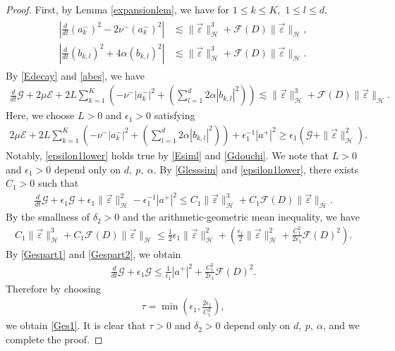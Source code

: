 \documentclass[reqno]{amsart}
\theoremstyle{plain}
\theoremstyle{definition}
\numberwithin{equation}{section}
\newcommand{\1}{\mathbbm{1}}
\begin{document}
\begin{proof}
First, by Lemma \ref{expansionlem}, we have for $1\leq k\leq K$,\ $1\leq l\leq d$, 
\begin{align}\label{abes}
\begin{aligned}
\left| \frac{d}{dt}(a_k^-)^2-2\nu^-(a_k^-)^2 \right|&\lesssim \|\vec{\varepsilon}\|_{\mathcal{H}}^3+\mathcal{F}(D)\|\vec{\varepsilon}\|_{\mathcal{H}},
\\
\left| \frac{d}{dt}(b_{k,l})^2+4\alpha (b_{k,l})^2\right|&\lesssim \|\vec{\varepsilon}\|_{\mathcal{H}}^3+\mathcal{F}(D)\|\vec{\varepsilon}\|_{\mathcal{H}}.
\end{aligned}
\end{align}
By \eqref{Edecay} and \eqref{abes}, we have
\begin{align}\label{Glesssim}
\frac{d}{dt}\mathcal{G}+2\mu \mathcal{E}+2L\sum_{k=1}^K\left( -\nu^-|a_k^-|^2+(\sum_{l=1}^d 2\alpha |b_{k,l}|^2)\right)\lesssim \|\vec{\varepsilon}\|_{\mathcal{H}}^3+\mathcal{F}(D)\|\vec{\varepsilon}\|_{\mathcal{H}}.
\end{align}
Here, we choose $L>0$ and $\epsilon_1>0$ satisfying 
\begin{align}\label{epsilon1lower}
2\mu \mathcal{E}+2L\sum_{k=1}^K\left( -\nu^-|a_k^-|^2+(\sum_{l=1}^d 2\alpha |b_{k,l}|^2)\right)+\epsilon_1^{-1}|a^+|^2\geq \epsilon_1(\mathcal{G}+\|\vec{\varepsilon}\|_{\mathcal{H}}^2).
\end{align}
Notably, \eqref{epsilon1lower} holds true by \eqref{Esiml} and \eqref{Gdouchi}. We note that $L>0$ and $\epsilon_1>0$ depend only on $d,\ p,\ \alpha$. By \eqref{Glesssim} and \eqref{epsilon1lower}, there exists $C_1>0$ such that 
\begin{align}\label{Gespart1}
\frac{d}{dt}\mathcal{G}+\epsilon_1\mathcal{G}+\epsilon_1\|\vec{\varepsilon}\|_{\mathcal{H}}^2-\epsilon_1^{-1}|a^+|^2\leq C_1\|\vec{\varepsilon}\|_{\mathcal{H}}^3+C_1\mathcal{F}(D)\|\vec{\varepsilon}\|_{\mathcal{H}}.
\end{align}
 By the smallness of $\delta_2>0$ and the arithmetic-geometric mean inequality, we have
\begin{align}\label{Gespart2}
C_1\|\vec{\varepsilon}\|_{\mathcal{H}}^3+C_1\mathcal{F}(D)\|\vec{\varepsilon}\|_{\mathcal{H}}\leq \frac{1}{2}\epsilon_1\|\vec{\varepsilon}\|_{\mathcal{H}}^2+\left(\frac{\epsilon_1}{2}\|\vec{\varepsilon}\|_{\mathcal{H}}^2+\frac{C_1^2}{2\epsilon_1}\mathcal{F}(D)^2\right).
\end{align}
By \eqref{Gespart1} and \eqref{Gespart2}, we obtain
\begin{align*}
\frac{d}{dt}\mathcal{G}+\epsilon_1\mathcal{G}\leq \frac{1}{\epsilon_1}|a^+|^2+\frac{C_1^2}{2\epsilon_1}\mathcal{F}(D)^2.
\end{align*}
Therefore by choosing
\begin{align*}
\tau=\min{\left(\epsilon_1, \frac{2\epsilon_1}{C_1^2}\right)},
\end{align*}
we obtain \eqref{Ges1}. It is clear that $\tau>0$ and $\delta_2>0$ depend only on $d,\ p,\ \alpha$, and we complete the proof. 
\end{proof}
\end{document}
